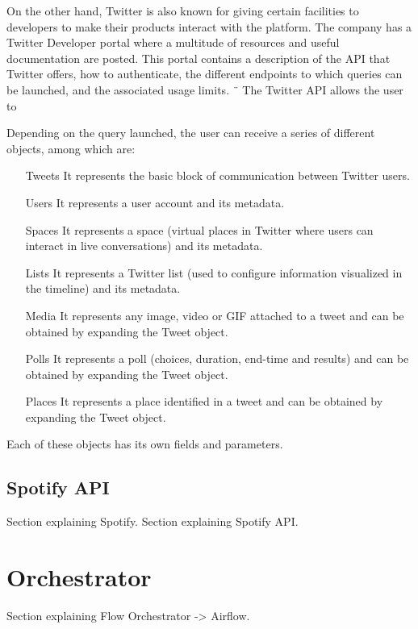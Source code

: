 \nonzeroparskip On the other hand, Twitter is also known for giving certain facilities to developers to make their products interact with the platform. The company has a Twitter Developer portal where a multitude of resources and useful documentation are posted. This portal contains a description of the API that Twitter offers, how to authenticate, the different endpoints to which queries can be launched, and the associated usage limits.
¨
\nonzeroparskip The Twitter API allows the user to 

\nonzeroparskip Depending on the query launched, the user can receive a series of different objects, among which are:
\begin{itemize}
	\item[Tweets] It represents the basic block of communication between Twitter users.
	\item[Users] It represents a user account and its metadata.
	\item[Spaces] It represents a space (virtual places in Twitter where users can interact in live conversations) and its metadata.
	\item[Lists] It represents a Twitter list (used to configure information visualized in the timeline) and its metadata.
	\item[Media] It represents any image, video or GIF attached to a tweet and can be obtained by expanding the Tweet object.
	\item[Polls] It represents a poll (choices, duration, end-time and results) and can be obtained by expanding the Tweet object.
	\item[Places] It represents a place identified in a tweet and can be obtained by expanding the Tweet object.
\end{itemize}

\nonzeroparskip Each of these objects has its own fields and parameters.

\subsection{Spotify API}
\nonzeroparskip Section explaining Spotify.
\nonzeroparskip Section explaining Spotify API.

\section{Orchestrator}

\nonzeroparskip Section explaining Flow Orchestrator -> Airflow.

